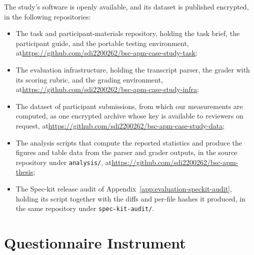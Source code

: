 The study's software is openly available, and its dataset is published encrypted, in the following repositories:
\begin{itemize}[nosep]
    \item The task and participant-materials repository, holding the task brief, the participant guide, and the portable testing environment, at\newline\url{https://github.com/sdi2200262/bsc-apm-case-study-task};
    \item The evaluation infrastructure, holding the transcript parser, the grader with its scoring rubric, and the grading environment, at\newline\url{https://github.com/sdi2200262/bsc-apm-case-study-infra};
    \item The dataset of participant submissions, from which our measurements are computed, as one encrypted archive whose key is available to reviewers on request, at\newline\url{https://github.com/sdi2200262/bsc-apm-case-study-data};
    \item The analysis scripts that compute the reported statistics and produce the figures and table data from the parser and grader outputs, in the source repository under \texttt{analysis/}, at\newline\url{https://github.com/sdi2200262/bsc-apm-thesis};
    \item The Spec-kit release audit of Appendix~\ref{app:evaluation-speckit-audit}, holding its script together with the diffs and per-file hashes it produced, in the same repository under \texttt{spec-kit-audit/}.
\end{itemize}

\section{Questionnaire Instrument}
\label{app:evaluation-questionnaire}

